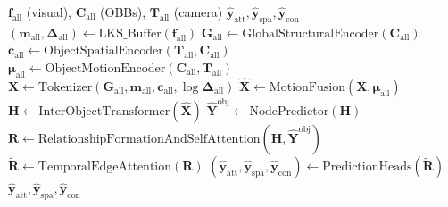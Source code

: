 \documentclass{article}
\newcommand{\mat}[1]{\bm{#1}}
\begin{document}
\begin{algorithm}[h]
\caption{W-STTran++ Forward Pass}
\begin{algorithmic}[1]
\Require $\mat{f}_{\text{all}}$ (visual), $\mat{C}_{\text{all}}$ (OBBs), $\mat{T}_{\text{all}}$ (camera)
\Ensure $\hat{\mat{y}}_{\text{att}}, \hat{\mat{y}}_{\text{spa}}, \hat{\mat{y}}_{\text{con}}$
\State $(\mat{m}_{\text{all}}, \bm{\Delta}_{\text{all}}) \gets \text{LKS\_Buffer}(\mat{f}_{\text{all}})$
\State $\mat{G}_{\text{all}} \gets \text{GlobalStructuralEncoder}(\mat{C}_{\text{all}})$
\State $\mat{c}_{\text{all}} \gets \text{ObjectSpatialEncoder}(\mat{T}_{\text{all}}, \mat{C}_{\text{all}})$
\State $\mat{\mu}_{\text{all}} \gets \text{ObjectMotionEncoder}(\mat{C}_{\text{all}}, \mat{T}_{\text{all}})$
\State $\mat{X} \gets \text{Tokenizer}(\mat{G}_{\text{all}}, \mat{m}_{\text{all}}, \mat{c}_{\text{all}}, \log \bm{\Delta}_{\text{all}})$
\State $\hat{\mat{X}} \gets \text{MotionFusion}(\mat{X}, \mat{\mu}_{\text{all}})$
\State $\mat{H} \gets \text{InterObjectTransformer}(\hat{\mat{X}})$
\State $\hat{\mat{Y}}^{\text{obj}} \gets \text{NodePredictor}(\mat{H})$
\State $\mat{R} \gets \text{RelationshipFormationAndSelfAttention}(\mat{H}, \hat{\mat{Y}}^{\text{obj}})$
\State $\tilde{\mat{R}} \gets \text{TemporalEdgeAttention}(\mat{R})$
\State $(\hat{\mat{y}}_{\text{att}}, \hat{\mat{y}}_{\text{spa}}, \hat{\mat{y}}_{\text{con}}) \gets \text{PredictionHeads}(\tilde{\mat{R}})$
\State \Return $\hat{\mat{y}}_{\text{att}}, \hat{\mat{y}}_{\text{spa}}, \hat{\mat{y}}_{\text{con}}$
\end{algorithmic}
\end{algorithm}
\end{document}
